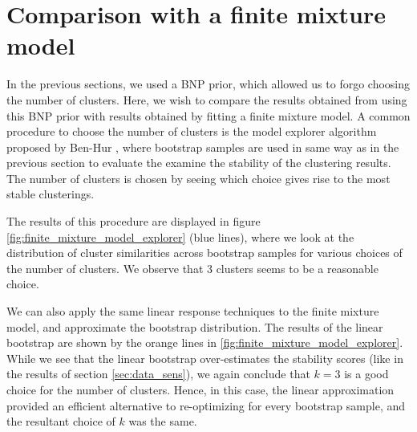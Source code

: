 \documentclass[a4paper]{article}
\begin{document}
\section{Comparison with a finite mixture model}
In the previous sections, we used a BNP prior, which allowed us to forgo choosing the number of clusters.
Here, we wish to compare the results obtained from using this BNP prior with results obtained by fitting a
finite mixture model. A common procedure to choose the number of clusters is the model explorer algorithm proposed by
Ben-Hur \cite{model_explorer}, where bootstrap samples are used in same way as in the previous section
to evaluate the examine the stability of the clustering results.
The number of clusters is chosen by seeing which choice gives rise to the most stable clusterings.

The results of this procedure are displayed in figure \ref{fig:finite_mixture_model_explorer} (blue lines),
where we look at the
distribution of cluster similarities across bootstrap samples for various choices
of the number of clusters. We observe that 3 clusters seems to be a reasonable choice.

We can also apply the same linear response techniques to the finite mixture model, and approximate the bootstrap distribution.
The results of the linear bootstrap are shown by the orange lines in \ref{fig:finite_mixture_model_explorer}.
While we see that the linear bootstrap over-estimates the stability scores (like in the results of section \ref{sec:data_sens}),
we again conclude that $k = 3$ is a good choice for the number of clusters. Hence, in this case, the linear
approximation provided an efficient alternative to re-optimizing for every bootstrap sample,
and the resultant choice of $k$ was the same.
\end{document}
